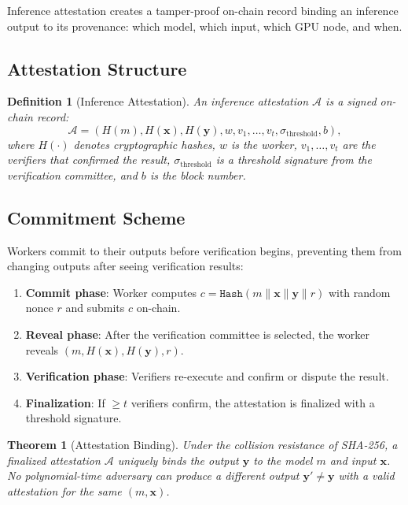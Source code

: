 \documentclass[11pt]{article}
\newtheorem{theorem}{Theorem}
\newtheorem{definition}{Definition}
\begin{document}
Inference attestation creates a tamper-proof on-chain record binding an
inference output to its provenance: which model, which input, which GPU node,
and when.

\subsection{Attestation Structure}

\begin{definition}[Inference Attestation]
An inference attestation $\mathcal{A}$ is a signed on-chain record:
\begin{equation}
\mathcal{A} = \left(H(m), H(\mathbf{x}), H(\mathbf{y}), w, v_1, \ldots, v_t,
\sigma_{\text{threshold}}, b\right),
\end{equation}
where $H(\cdot)$ denotes cryptographic hashes, $w$ is the worker, $v_1,
\ldots, v_t$ are the verifiers that confirmed the result, $\sigma_{\text{threshold}}$
is a threshold signature from the verification committee, and $b$ is the block
number.
\end{definition}

\subsection{Commitment Scheme}

Workers commit to their outputs before verification begins, preventing them
from changing outputs after seeing verification results:

\begin{enumerate}[leftmargin=1.4em]
    \item \textbf{Commit phase}: Worker computes $c = \texttt{Hash}(m \|
    \mathbf{x} \| \mathbf{y} \| r)$ with random nonce $r$ and submits $c$
    on-chain.
    \item \textbf{Reveal phase}: After the verification committee is selected,
    the worker reveals $(m, H(\mathbf{x}), H(\mathbf{y}), r)$.
    \item \textbf{Verification phase}: Verifiers re-execute and confirm or
    dispute the result.
    \item \textbf{Finalization}: If $\geq t$ verifiers confirm, the attestation
    is finalized with a threshold signature.
\end{enumerate}

\begin{theorem}[Attestation Binding]
Under the collision resistance of SHA-256, a finalized attestation
$\mathcal{A}$ uniquely binds the output $\mathbf{y}$ to the model $m$ and input
$\mathbf{x}$. No polynomial-time adversary can produce a different output
$\mathbf{y}' \neq \mathbf{y}$ with a valid attestation for the same $(m,
\mathbf{x})$.
\end{theorem}
\end{document}
